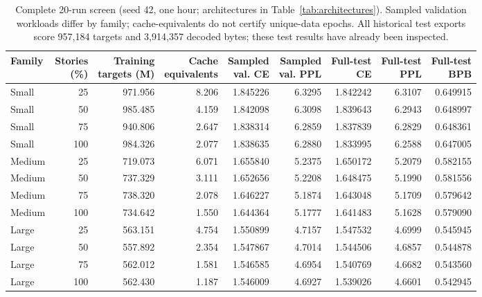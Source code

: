 \begin{table}[t]
\centering
\fontsize{9}{11}\selectfont
\setlength{\tabcolsep}{4pt}
\caption{Complete 20-run screen (seed 42, one hour; architectures in Table~\ref{tab:architectures}). Sampled validation workloads differ by family; cache-equivalents do not certify unique-data epochs. All historical test exports score 957,184 targets and 3,914,357 decoded bytes; these test results have already been inspected.}
\label{tab:allscreen}
\begin{tabular}{lrrrrrrrr}
\toprule
Family & \shortstack{Stories\\(\%)} & \shortstack{Training\\targets (M)} & \shortstack{Cache\\equivalents} & \shortstack{Sampled\\val. CE} & \shortstack{Sampled\\val. PPL} & \shortstack{Full-test\\CE} & \shortstack{Full-test\\PPL} & \shortstack{Full-test\\BPB}\\
\midrule
Small & 25 & 971.956 & 8.206 & 1.845226 & 6.3295 & 1.842242 & 6.3107 & 0.649915\\
Small & 50 & 985.485 & 4.159 & 1.842098 & 6.3098 & 1.839643 & 6.2943 & 0.648997\\
Small & 75 & 940.806 & 2.647 & 1.838314 & 6.2859 & 1.837839 & 6.2829 & 0.648361\\
Small & 100 & 984.326 & 2.077 & 1.838635 & 6.2880 & 1.833995 & 6.2588 & 0.647005\\
\addlinespace[3pt]
Medium & 25 & 719.073 & 6.071 & 1.655840 & 5.2375 & 1.650172 & 5.2079 & 0.582155\\
Medium & 50 & 737.329 & 3.111 & 1.652656 & 5.2208 & 1.648475 & 5.1990 & 0.581556\\
Medium & 75 & 738.320 & 2.078 & 1.646227 & 5.1874 & 1.643048 & 5.1709 & 0.579642\\
Medium & 100 & 734.642 & 1.550 & 1.644364 & 5.1777 & 1.641483 & 5.1628 & 0.579090\\
\addlinespace[3pt]
Large & 25 & 563.151 & 4.754 & 1.550899 & 4.7157 & 1.547532 & 4.6999 & 0.545945\\
Large & 50 & 557.892 & 2.354 & 1.547867 & 4.7014 & 1.544506 & 4.6857 & 0.544878\\
Large & 75 & 562.012 & 1.581 & 1.546585 & 4.6954 & 1.540769 & 4.6682 & 0.543560\\
Large & 100 & 562.430 & 1.187 & 1.546009 & 4.6927 & 1.539026 & 4.6601 & 0.542945\\

\end{tabular}
\end{table}

